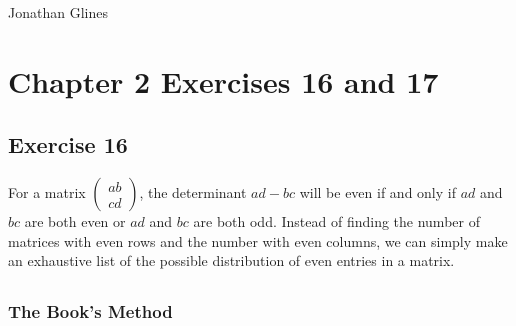 \documentclass[12pt]{article}
\begin{document}
\begin{flushright}
\Large{Jonathan Glines}
\end{flushright}
\section*{Chapter 2 Exercises 16 and 17}
\subsection*{Exercise 16}
For a matrix $\left(\begin{matrix} a b \\ c d\end{matrix}\right)$, the determinant $ad - bc$ will be even if and only if $ad$ and $bc$ are both even or $ad$ and $bc$ are both odd. Instead of finding the number of matrices with even rows and the number with even columns, we can simply make an exhaustive list of the possible distribution of even entries in a matrix.
\[
\begin{matrix}

\end{matrix}
\]

\subsubsection*{The Book's Method}
\begin{itemize}
\end{itemize}
\end{document}
